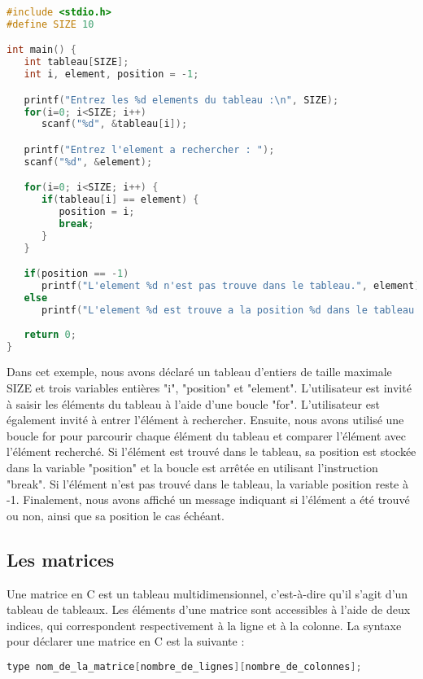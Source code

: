 \documentclass{uofa-eng-assignment}
\begin{document}
\begin{lstlisting}[language=c]
#include <stdio.h>
#define SIZE 10

int main() {
   int tableau[SIZE];
   int i, element, position = -1;

   printf("Entrez les %d elements du tableau :\n", SIZE);
   for(i=0; i<SIZE; i++)
      scanf("%d", &tableau[i]);

   printf("Entrez l'element a rechercher : ");
   scanf("%d", &element);

   for(i=0; i<SIZE; i++) {
      if(tableau[i] == element) {
         position = i;
         break;
      }
   }

   if(position == -1)
      printf("L'element %d n'est pas trouve dans le tableau.", element);
   else
      printf("L'element %d est trouve a la position %d dans le tableau.", element, position);
   
   return 0;
}
\end{lstlisting}

\noindent \newline
Dans cet exemple, nous avons déclaré un tableau d'entiers de taille maximale SIZE et trois variables entières "i", "position" et "element". L'utilisateur est invité à saisir les éléments du tableau à l'aide d'une boucle "for". L'utilisateur est également invité à entrer l'élément à rechercher. Ensuite, nous avons utilisé une boucle for pour parcourir chaque élément du tableau et comparer l'élément avec l'élément recherché. Si l'élément est trouvé dans le tableau, sa position est stockée dans la variable "position" et la boucle est arrêtée en utilisant l'instruction "break". Si l'élément n'est pas trouvé dans le tableau, la variable position reste à -1. Finalement, nous avons affiché un message indiquant si l'élément a été trouvé ou non, ainsi que sa position le cas échéant.

\subsection{Les matrices}
Une matrice en C est un tableau multidimensionnel, c'est-à-dire qu'il s'agit d'un tableau de tableaux. Les éléments d'une matrice sont accessibles à l'aide de deux indices, qui correspondent respectivement à la ligne et à la colonne.
\newline \newline
La syntaxe pour déclarer une matrice en C est la suivante :

\begin{lstlisting}[language=c]
type nom_de_la_matrice[nombre_de_lignes][nombre_de_colonnes];
\end{lstlisting}
\end{document}
